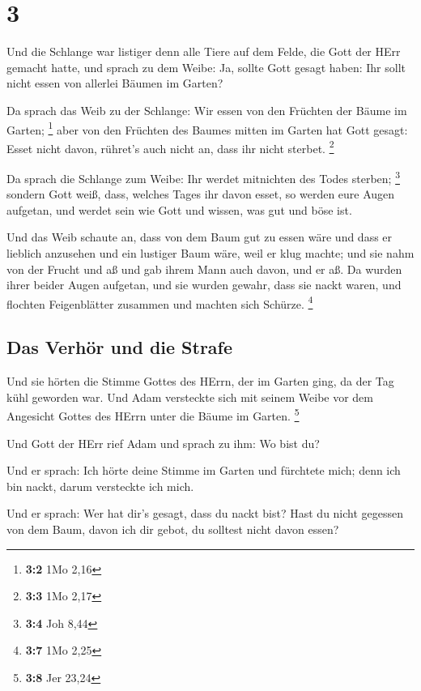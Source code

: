 \hypertarget{section-2}{%
\section{3}\label{section-2}}

 Und die Schlange war listiger denn alle Tiere auf dem
Felde, die Gott der HErr gemacht hatte, und sprach zu dem Weibe: Ja,
sollte Gott gesagt haben: Ihr sollt nicht essen von allerlei Bäumen im
Garten?

 Da sprach das Weib zu der Schlange: Wir essen von den
Früchten der Bäume im Garten; \footnote{\textbf{3:2} 1Mo 2,16}
 aber von den Früchten des Baumes mitten im Garten hat
Gott gesagt: Esset nicht davon, rühret's auch nicht an, dass ihr nicht
sterbet. \footnote{\textbf{3:3} 1Mo 2,17}

 Da sprach die Schlange zum Weibe: Ihr werdet mitnichten
des Todes sterben; \footnote{\textbf{3:4} Joh 8,44} 
sondern Gott weiß, dass, welches Tages ihr davon esset, so werden eure
Augen aufgetan, und werdet sein wie Gott und wissen, was gut und böse
ist.

 Und das Weib schaute an, dass von dem Baum gut zu essen
wäre und dass er lieblich anzusehen und ein lustiger Baum wäre, weil er
klug machte; und sie nahm von der Frucht und aß und gab ihrem Mann auch
davon, und er aß.  Da wurden ihrer beider Augen aufgetan,
und sie wurden gewahr, dass sie nackt waren, und flochten Feigenblätter
zusammen und machten sich Schürze. \footnote{\textbf{3:7} 1Mo 2,25}

\hypertarget{das-verhuxf6r-und-die-strafe}{%
\subsection{Das Verhör und die
Strafe}\label{das-verhuxf6r-und-die-strafe}}

 Und sie hörten die Stimme Gottes des HErrn, der im Garten
ging, da der Tag kühl geworden war. Und Adam versteckte sich mit seinem
Weibe vor dem Angesicht Gottes des HErrn unter die Bäume im Garten.
\footnote{\textbf{3:8} Jer 23,24}

 Und Gott der HErr rief Adam und sprach zu ihm: Wo bist
du?

 Und er sprach: Ich hörte deine Stimme im Garten und
fürchtete mich; denn ich bin nackt, darum versteckte ich mich.

 Und er sprach: Wer hat dir's gesagt, dass du nackt bist?
Hast du nicht gegessen von dem Baum, davon ich dir gebot, du solltest
nicht davon essen?

